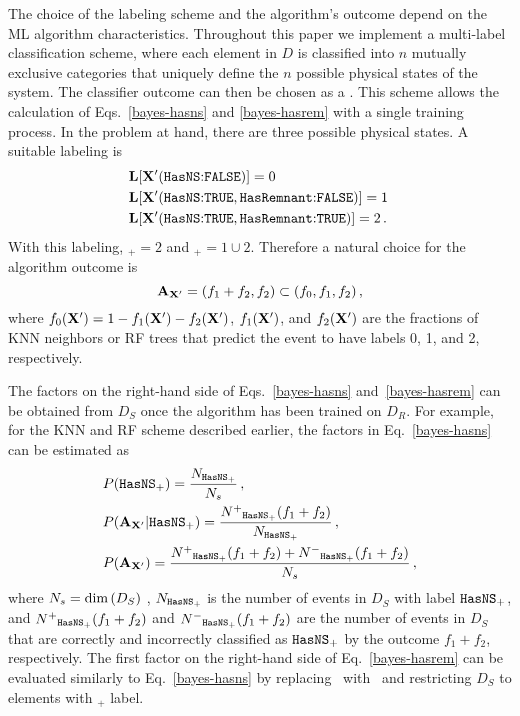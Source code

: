 The choice of the labeling scheme and the algorithm's outcome depend on the \ac{ML} algorithm characteristics. Throughout this paper we implement a multi-label classification scheme,
where each element in $D$ is classified into $n$ mutually exclusive categories that uniquely define the $n$ possible physical states of the system. The classifier outcome can then be
chosen as a . This scheme allows the calculation of Eqs.~\eqref{bayes-hasns} and \eqref{bayes-hasrem} with a single
training process. In the problem at hand, there are three possible physical states. A suitable labeling is
%
\begin{align}
&{\bf L}[{\bf X}'(\hbox{{{\tt HasNS}}:{{\tt FALSE}}})]=0\,\nonumber\\
&{\bf L}[{\bf X}'(\hbox{{{\tt HasNS}}:{{\tt TRUE}}},\hbox{{{\tt HasRemnant}}:{{\tt FALSE}}})]=1\,\\
&{\bf L}[{\bf X}'(\hbox{{{\tt HasNS}}:{{\tt TRUE}}},\hbox{{{\tt HasRemnant}}:{{\tt TRUE}}})]=2\,.\nonumber
\end{align}
%
With this labeling, \hasrem$_+=2$ and \hasns$_+=1\cup 2$. Therefore a natural choice for the algorithm outcome is
%
\begin{equation}
{\bf A}_{\bf X'}=(f_1+f_2,f_2)\subset (f_0,f_1,f_2)\,,
\end{equation}
%
where $f_0({\bf X}')=1-f_1({\bf X}')-f_2({\bf X}')$, $f_1({\bf X}')$, and $f_2({\bf X}')$ are the fractions of \ac{KNN} neighbors or \ac{RF} trees that predict the event to
have labels 0, 1, and 2, respectively.

The factors on the right-hand side of Eqs.~\eqref{bayes-hasns} and~\eqref{bayes-hasrem} can be obtained from $D_{S}$ once the algorithm has been trained on $D_{R}$. For example, for the \ac{KNN} and \ac{RF} scheme described earlier, the factors in Eq.~\eqref{bayes-hasns} can be estimated as  
%
\begin{align}
&P({{\tt HasNS}}_+)=\frac{N_{{{\tt HasNS}}_+}}{N_s}\,,\nonumber\\
&P({\bf A}_{{\bf X}'}|{{\tt HasNS}}_+)=\frac{N^+{}_{{{\tt HasNS}}_+}(f_1+f_2)}{N_{{{\tt HasNS}}_+}}\,,\\
&P({\bf A}_{{\bf X}'})=\frac{N^+{}_{{{\tt HasNS}}_+}(f_1+f_2)+N^-{}_{{{\tt HasNS}}_+}(f_1+f_2)}{N_s}\,,\nonumber
\label{bayes-est}
\end{align}
%
where $N_s=\hbox{dim}\,(D_S)$ , $N_{{{\tt HasNS}}_+}$ is the number of events in $D_S$ with label  ${{\tt HasNS}}_+$, and $N^+{}_{{{\tt HasNS}}_+}(f_1+f_2)$ and $N^-{}_{{{\tt HasNS}}_+}(f_1+f_2)$ are the number of
events in $D_S$ that are correctly and incorrectly classified as ${{{\tt HasNS}}_+}$ by the outcome $f_1+f_2$, respectively. The first factor on the right-hand side of Eq.~\eqref{bayes-hasrem}
can be evaluated similarly to Eq.~\eqref{bayes-hasns} by replacing \hasns\ with \hasrem\ and restricting $D_S$ to elements with \hasns$_+$ label.

